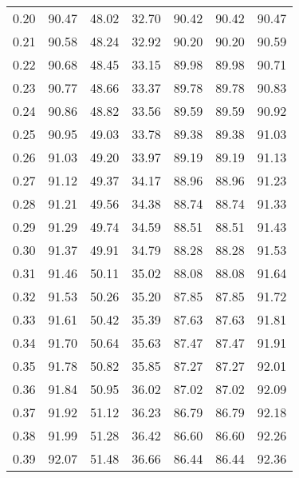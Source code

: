 \begin{tabular}{|c|c|c|c|c|c|c|}
      0.20 &     90.47 &     48.02 &      32.70 &   90.42 &      90.42 &         90.47 \\
      0.21 &     90.58 &     48.24 &      32.92 &   90.20 &      90.20 &         90.59 \\
      0.22 &     90.68 &     48.45 &      33.15 &   89.98 &      89.98 &         90.71 \\
      0.23 &     90.77 &     48.66 &      33.37 &   89.78 &      89.78 &         90.83 \\
      0.24 &     90.86 &     48.82 &      33.56 &   89.59 &      89.59 &         90.92 \\
      0.25 &     90.95 &     49.03 &      33.78 &   89.38 &      89.38 &         91.03 \\
      0.26 &     91.03 &     49.20 &      33.97 &   89.19 &      89.19 &         91.13 \\
      0.27 &     91.12 &     49.37 &      34.17 &   88.96 &      88.96 &         91.23 \\
      0.28 &     91.21 &     49.56 &      34.38 &   88.74 &      88.74 &         91.33 \\
      0.29 &     91.29 &     49.74 &      34.59 &   88.51 &      88.51 &         91.43 \\
      0.30 &     91.37 &     49.91 &      34.79 &   88.28 &      88.28 &         91.53 \\
      0.31 &     91.46 &     50.11 &      35.02 &   88.08 &      88.08 &         91.64 \\
      0.32 &     91.53 &     50.26 &      35.20 &   87.85 &      87.85 &         91.72 \\
      0.33 &     91.61 &     50.42 &      35.39 &   87.63 &      87.63 &         91.81 \\
      0.34 &     91.70 &     50.64 &      35.63 &   87.47 &      87.47 &         91.91 \\
      0.35 &     91.78 &     50.82 &      35.85 &   87.27 &      87.27 &         92.01 \\
      0.36 &     91.84 &     50.95 &      36.02 &   87.02 &      87.02 &         92.09 \\
      0.37 &     91.92 &     51.12 &      36.23 &   86.79 &      86.79 &         92.18 \\
      0.38 &     91.99 &     51.28 &      36.42 &   86.60 &      86.60 &         92.26 \\
      0.39 &     92.07 &     51.48 &      36.66 &   86.44 &      86.44 &         92.36 \\

\end{tabular}

